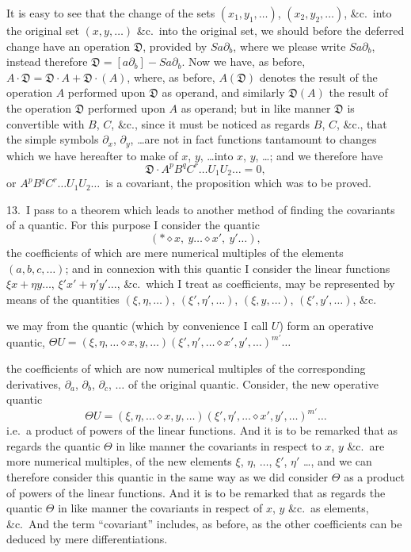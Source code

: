 \documentclass[11pt,a4paper]{article}
\begin{document}
It is easy to see that the change of the sets $(x_1, y_1, \ldots)$, $(x_2, y_2, \ldots)$, \&c.\ into the original set $(x, y, \ldots)$ \&c.\ into the original set, we should before the deferred change have an operation $\mathfrak{D}$, provided by $S a\partial_b$, where we please write $S a\partial_b$, instead therefore $\mathfrak{D} = [a\partial_b] - S a\partial_b$. Now we have, as before, $A\cdot\mathfrak{D} = \mathfrak{D}\cdot A + \mathfrak{D}\cdot (A)$, where, as before, $A(\mathfrak{D})$ denotes the result of the operation $A$ performed upon $\mathfrak{D}$ as operand, and similarly $\mathfrak{D}(A)$ the result of the operation $\mathfrak{D}$ performed upon $A$ as operand; but in like manner $\mathfrak{D}$ is convertible with $B$, $C$, \&c., since it must be noticed as regards $B$, $C$, \&c., that the simple symbols $\partial_x$, $\partial_y$, \ldots are not in fact functions tantamount to changes which we have hereafter to make of $x$, $y$, \ldots into $x$, $y$, \ldots; and we therefore have
\[
\mathfrak{D}\cdot A^p B^q C^r \ldots U_1 U_2 \ldots = 0,
\]
or $A^p B^q C^r \ldots U_1 U_2 \ldots$\ is a covariant, the proposition which was to be proved.

\medskip

13.\ I pass to a theorem which leads to another method of finding the covariants of a quantic. For this purpose I consider the quantic
\[
(*\diamond x,\ y\ldots\diamond x',\ y'\ldots),
\]
the coefficients of which are mere numerical multiples of the elements $(a, b, c, \ldots)$; and in connexion with this quantic I consider the linear functions $\xi x + \eta y \ldots$, $\xi' x' + \eta' y' \ldots$, \&c.\ which I treat as coefficients, may be represented by means of the quantities $(\xi, \eta, \ldots)$, $(\xi', \eta', \ldots)$, $(\xi, y, \ldots)$, $(\xi', y', \ldots)$, \&c.

\medskip

we may from the quantic (which by convenience I call $U$) form an operative quantic, $\Theta U = (\xi, \eta, \ldots\diamond x, y, \ldots)(\xi', \eta', \ldots\diamond x', y', \ldots)^{m'}\ldots$

the coefficients of which are now numerical multiples of the corresponding derivatives, $\partial_a$, $\partial_b$, $\partial_c$, $\ldots$ of the original quantic. Consider, the new operative quantic
\[
\Theta U = (\xi, \eta, \ldots\diamond x, y, \ldots)(\xi', \eta', \ldots\diamond x', y', \ldots)^{m'}\ldots
\]
i.e.\ a product of powers of the linear functions. And it is to be remarked that as regards the quantic $\Theta$ in like manner the covariants in respect to $x$, $y$ \&c.\ are more numerical multiples, of the new elements $\xi$, $\eta$, $\ldots$, $\xi'$, $\eta'$ \ldots, and we can therefore consider this quantic in the same way as we did consider $\Theta$ as a product of powers of the linear functions. And it is to be remarked that as regards the quantic $\Theta$ in like manner the covariants in respect of $x$, $y$ \&c.\ as elements, \&c.\ And the term ``covariant'' includes, as before, as the other coefficients can be deduced by mere differentiations.
\end{document}
